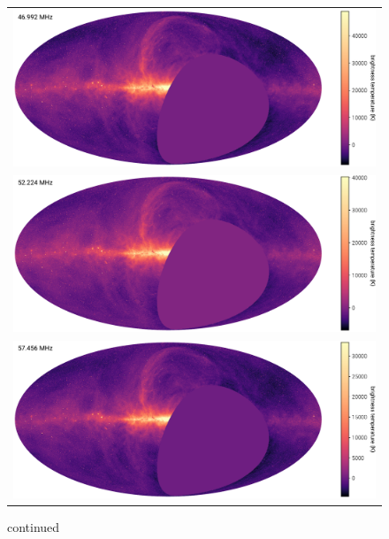 \begin{bibunit}
\addtocounter{figure}{-1}
\begin{figure}[p]
    \centering
    \begin{tabular}{c}
        \includegraphics[height=0.32\textheight]{figures/chapter3/spw08} \\
        \includegraphics[height=0.32\textheight]{figures/chapter3/spw10} \\
        \includegraphics[height=0.32\textheight]{figures/chapter3/spw12} \\
    \end{tabular}
    \caption{
        continued
    }
\end{figure}


\end{bibunit}
